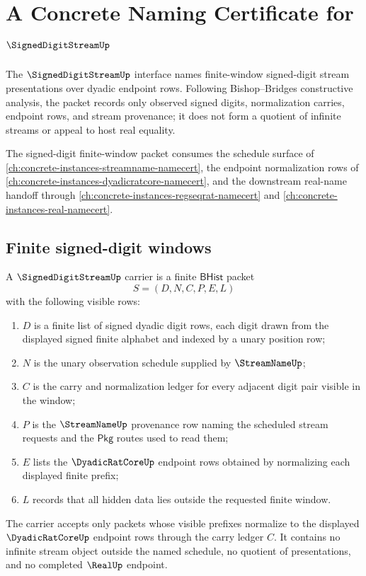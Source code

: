 \chapter{A Concrete Naming Certificate for $\SignedDigitStreamUp$}
\label{ch:concrete-instances-signeddigitstream-namecert}

The $\SignedDigitStreamUp$ interface names finite-window signed-digit stream presentations over dyadic endpoint rows. Following Bishop--Bridges constructive analysis, the packet records only observed signed digits, normalization carries, endpoint rows, and stream provenance; it does not form a quotient of infinite streams or appeal to host real equality.

The signed-digit finite-window packet consumes the schedule surface of \autoref{ch:concrete-instances-streamname-namecert}, the endpoint normalization rows of \autoref{ch:concrete-instances-dyadicratcore-namecert}, and the downstream real-name handoff through \autoref{ch:concrete-instances-regseqrat-namecert} and \autoref{ch:concrete-instances-real-namecert}.

\section{Finite signed-digit windows}
\label{sec:signeddigitstream-finite-windows}

\begin{definition}
\label{def:signeddigitstream-carrier}
A $\SignedDigitStreamUp$ carrier is a finite $\mathsf{BHist}$ packet
$$
S=(D,N,C,P,E,L)
$$
with the following visible rows:
\begin{enumerate}
\item $D$ is a finite list of signed dyadic digit rows, each digit drawn from the displayed signed finite alphabet and indexed by a unary position row;
\item $N$ is the unary observation schedule supplied by $\StreamNameUp$;
\item $C$ is the carry and normalization ledger for every adjacent digit pair visible in the window;
\item $P$ is the $\StreamNameUp$ provenance row naming the scheduled stream requests and the $\mathsf{Pkg}$ routes used to read them;
\item $E$ lists the $\DyadicRatCoreUp$ endpoint rows obtained by normalizing each displayed finite prefix;
\item $L$ records that all hidden data lies outside the requested finite window.
\end{enumerate}
The carrier accepts only packets whose visible prefixes normalize to the displayed $\DyadicRatCoreUp$ endpoint rows through the carry ledger $C$. It contains no infinite stream object outside the named schedule, no quotient of presentations, and no completed $\RealUp$ endpoint.
\end{definition}

